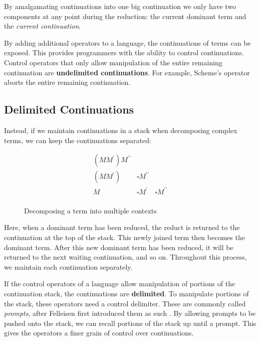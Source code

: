   By amalgamating continuations into one big continuation we only have two components at any point during the reduction: 
  the current dominant term and the \emph{current continuation}. 
 
  By adding additional operators to a language, the continuations of terms can be exposed.
  This provides programmers with the ability to control continuations.
  Control operators that only allow manipulation of the entire remaining continuation are \textbf{undelimited continuations}. 
  For example, Scheme's  operator aborts the entire remaining continuation.

  \subsection{Delimited Continuations}

  Instead, if we maintain continuations in a stack when decomposing complex terms, 
  we can keep the continuations separated:
  
  \begin{figure}[H]
    \[
    \begin{array}{lll}
      (MM^\prime) M^{\prime\prime} \\
      (MM^\prime) & \square M^{\prime\prime} \\
      M & \square M^\prime & \square M^{\prime\prime} \\
    \end{array}
    \]
  \caption{Decomposing a term into multiple contexts}
  \end{figure}

  Here, when a dominant term has been reduced, 
  the reduct is returned to the continuation at the top of the stack. 
  This newly joined term then becomes the dominant term. 
  After this new dominant term has been reduced, 
  it will be returned to the next waiting continuation, and so on. 
  Throughout this process, we maintain each continuation separately.

  If the control operators of a language allow manipulation of portions of the continuation stack,
  the continuations are \textbf{delimited}.
  To manipulate portions of the stack, these operators need a control delimiter.
  These are commonly called \emph{prompts}, after Felleisen first introduced them as such \cite{Felleisen88}.
  By allowing prompts to be pushed onto the stack, we can recall portions of the stack up until a prompt.
  This gives the operators a finer grain of control over continuations.

